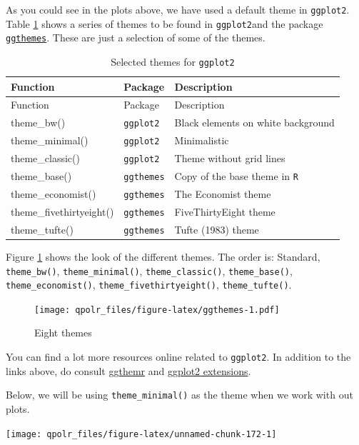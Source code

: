 \documentclass[12pt,oneside]{reedthesis}
\theoremstyle{definition}
\theoremstyle{definition}
\theoremstyle{definition}
\theoremstyle{remark}
\begin{document}
  As you could see in the plots above, we have used a default theme in
  \texttt{ggplot2}. Table \ref{tab:ggthemes} shows a series of themes to
  be found in \texttt{ggplot2}and the package
  \href{https://cran.r-project.org/web/packages/ggthemes/vignettes/ggthemes.html}{\texttt{ggthemes}}.
  These are just a selection of some of the themes.
  \begin{longtable}[]{@{}lll@{}}
  \caption{\label{tab:ggthemes} Selected themes for
  \texttt{ggplot2}}\tabularnewline
  \toprule
  Function & Package & Description\tabularnewline
  \midrule
  \endfirsthead
  \toprule
  Function & Package & Description\tabularnewline
  \midrule
  \endhead
  theme\_bw() & \texttt{ggplot2} & Black elements on white
  background\tabularnewline
  theme\_minimal() & \texttt{ggplot2} & Minimalistic\tabularnewline
  theme\_classic() & \texttt{ggplot2} & Theme without grid
  lines\tabularnewline
  theme\_base() & \texttt{ggthemes} & Copy of the base theme in
  \texttt{R}\tabularnewline
  theme\_economist() & \texttt{ggthemes} & The Economist
  theme\tabularnewline
  theme\_fivethirtyeight() & \texttt{ggthemes} & FiveThirtyEight
  theme\tabularnewline
  theme\_tufte() & \texttt{ggthemes} & Tufte (1983) theme\tabularnewline
  \bottomrule
  \end{longtable}
  Figure \ref{fig:ggthemes} shows the look of the different themes. The
  order is: Standard, \texttt{theme\_bw()}, \texttt{theme\_minimal()},
  \texttt{theme\_classic()}, \texttt{theme\_base()},
  \texttt{theme\_economist()}, \texttt{theme\_fivethirtyeight()},
  \texttt{theme\_tufte()}.
  \begin{figure}
  \centering
  \texttt{[image: qpolr\_files/figure-latex/ggthemes-1.pdf]}
  \caption{\label{fig:ggthemes}Eight themes}
  \end{figure}
  You can find a lot more resources online related to \texttt{ggplot2}. In
  addition to the links above, do consult
  \href{https://github.com/cttobin/ggthemr}{ggthemr} and
  \href{https://www.ggplot2-exts.org/}{ggplot2 extensions}.
  
  Below, we will be using \texttt{theme\_minimal()} as the theme when we
  work with out plots.
  \begin{Shaded}
  \begin{Highlighting}[]
  \NormalTok{(}\OperatorTok{+}
  \StringTok{  }\NormalTok{(} \NormalTok{) }\OperatorTok{+}\StringTok{ }
  \StringTok{  }\NormalTok{(}\NormalTok{) }\OperatorTok{+}
  \StringTok{  }\NormalTok{()}
  \end{Highlighting}
  \end{Shaded}
  \begin{center}\texttt{[image: qpolr\_files/figure-latex/unnamed-chunk-172-1]} \end{center}
  
\end{document}
